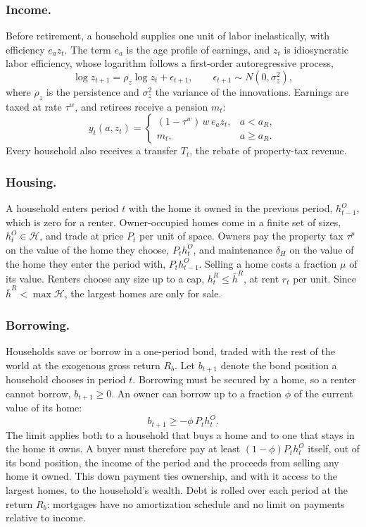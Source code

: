\subsubsection*{Income.}
Before retirement, a household supplies one unit of labor inelastically, with
efficiency $e_az_t$. The term $e_a$ is the age profile of earnings, and $z_t$
is idiosyncratic labor efficiency, whose logarithm follows a first-order
autoregressive process,
\begin{equation*}
 \log z_{t+1}=\rho_z\log z_t+\epsilon_{t+1},\qquad
 \epsilon_{t+1}\sim N(0,\sigma_z^2),
\end{equation*}
where $\rho_z$ is the persistence and $\sigma_z^2$ the variance of the
innovations. Earnings are taxed at rate
$\tau^w$, and retirees receive a pension $m_t$:
\begin{equation*}
 y_t(a,z_t)=\begin{cases}(1-\tau^w)\,w\,e_az_t, & a<a_R,\\ m_t, & a\ge a_R.\end{cases}
\end{equation*}
Every household also receives a transfer $T_t$, the rebate of property-tax
revenue.

\subsubsection*{Housing.}
A household enters period $t$ with the home it owned in the previous period,
$h^O_{t-1}$, which is zero for a renter. Owner-occupied homes come in a finite
set of sizes, $h^O_t\in\mathcal H$, and trade at price $P_t$ per unit of
space. Owners pay the property tax $\tau^p$ on the value of the home they
choose, $P_th^O_t$, and maintenance $\delta_H$ on the value of the home they
enter the period with, $P_th^O_{t-1}$. Selling a home costs a fraction $\mu$
of its value. Renters choose any size up to a cap, $h^R_t\le\bar h^R$, at rent
$r_t$ per unit. Since $\bar h^R<\max\mathcal H$, the largest homes are only
for sale.

\subsubsection*{Borrowing.}
Households save or borrow in a one-period bond, traded with the rest of the
world at the exogenous gross return $R_b$. Let $b_{t+1}$ denote the bond
position a household chooses in period $t$.
Borrowing must be secured by a home, so a renter cannot borrow,
$b_{t+1}\ge0$. An owner can borrow up to a fraction $\phi$ of the current
value of its home:
\begin{equation}
 b_{t+1}\ge-\phi\,P_th^O_t .
 \label{eq:m-ltv}
\end{equation}
The limit applies both to a household that buys a home and to one that stays
in the home it owns. A buyer must therefore pay at least $(1-\phi)P_th^O_t$
itself, out of its bond position, the income of the period and the proceeds
from selling any home it owned. This down payment ties ownership, and with it
access to the largest homes, to the household's wealth. Debt is rolled over
each period at the return $R_b$: mortgages have no amortization schedule and
no limit on payments relative to income.

